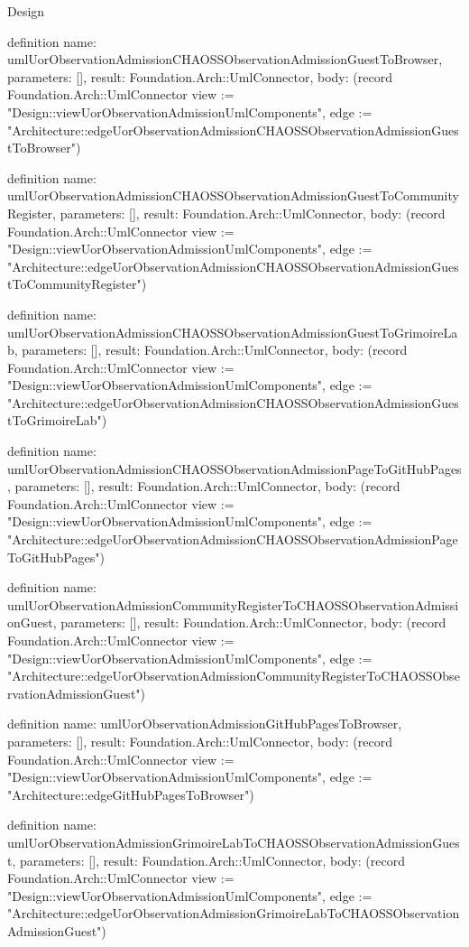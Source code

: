 \begin{lexlean}{Design}
\begin{semanticmodule}
definition{
  name: umlUorObservationAdmissionCHAOSSObservationAdmissionGuestToBrowser,
  parameters: [],
  result: Foundation.Arch::UmlConnector,
  body: (record Foundation.Arch::UmlConnector {view := "Design::viewUorObservationAdmissionUmlComponents", edge := "Architecture::edgeUorObservationAdmissionCHAOSSObservationAdmissionGuestToBrowser"})
}

definition{
  name: umlUorObservationAdmissionCHAOSSObservationAdmissionGuestToCommunityRegister,
  parameters: [],
  result: Foundation.Arch::UmlConnector,
  body: (record Foundation.Arch::UmlConnector {view := "Design::viewUorObservationAdmissionUmlComponents", edge := "Architecture::edgeUorObservationAdmissionCHAOSSObservationAdmissionGuestToCommunityRegister"})
}

definition{
  name: umlUorObservationAdmissionCHAOSSObservationAdmissionGuestToGrimoireLab,
  parameters: [],
  result: Foundation.Arch::UmlConnector,
  body: (record Foundation.Arch::UmlConnector {view := "Design::viewUorObservationAdmissionUmlComponents", edge := "Architecture::edgeUorObservationAdmissionCHAOSSObservationAdmissionGuestToGrimoireLab"})
}

definition{
  name: umlUorObservationAdmissionCHAOSSObservationAdmissionPageToGitHubPages,
  parameters: [],
  result: Foundation.Arch::UmlConnector,
  body: (record Foundation.Arch::UmlConnector {view := "Design::viewUorObservationAdmissionUmlComponents", edge := "Architecture::edgeUorObservationAdmissionCHAOSSObservationAdmissionPageToGitHubPages"})
}

definition{
  name: umlUorObservationAdmissionCommunityRegisterToCHAOSSObservationAdmissionGuest,
  parameters: [],
  result: Foundation.Arch::UmlConnector,
  body: (record Foundation.Arch::UmlConnector {view := "Design::viewUorObservationAdmissionUmlComponents", edge := "Architecture::edgeUorObservationAdmissionCommunityRegisterToCHAOSSObservationAdmissionGuest"})
}

definition{
  name: umlUorObservationAdmissionGitHubPagesToBrowser,
  parameters: [],
  result: Foundation.Arch::UmlConnector,
  body: (record Foundation.Arch::UmlConnector {view := "Design::viewUorObservationAdmissionUmlComponents", edge := "Architecture::edgeGitHubPagesToBrowser"})
}

definition{
  name: umlUorObservationAdmissionGrimoireLabToCHAOSSObservationAdmissionGuest,
  parameters: [],
  result: Foundation.Arch::UmlConnector,
  body: (record Foundation.Arch::UmlConnector {view := "Design::viewUorObservationAdmissionUmlComponents", edge := "Architecture::edgeUorObservationAdmissionGrimoireLabToCHAOSSObservationAdmissionGuest"})
}


\end{semanticmodule}
\end{lexlean}
